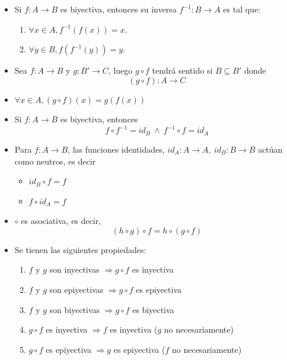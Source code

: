 \documentclass[letterpaper,11pt]{article}
\theoremstyle{plain}
\begin{document}
\begin{framed}
\begin{multicols}{2}
\begin{itemize}
                \item Si $f: A \to B$ es biyectiva, entonces su inversa $f^{-1}:B \to A$ es tal que:
                    \begin{enumerate}
                        \item $\forall x \in A, f^{-1}(f(x))=x$.
                        \item $\forall y \in B, f(f^{-1}(y))=y$. 
                    \end{enumerate}
                    
                \item Sea $f:A \to B$ y $g:B'\to C$, luego $g \circ f$ tendrá sentido si $B\subseteq B'$ donde $$(g \circ f): A \to C $$
    
                \item $ \forall x \in A, (g \circ f)(x)=g(f(x))$
    
                \item Si $f: A \to B$ es biyectiva, entonces $$f \circ f^{-1}=id_{B} ~\land~ f^{-1} \circ f=id_{A}$$
    
                \item Para $f:A \to B$, las funciones identidades,
                $id_{A} : A\to A,~ id_{B} : B \to B$ actúan como neutros, es decir
                    \begin{itemize}
                        \item $id_{B} \circ f=f$
                        \item $f \circ id_{A}=f$
                     \end{itemize}
    
                \item $\circ$ es asociativa, es decir, $$(h \circ g) \circ f=h \circ (g \circ f)$$ 
    
                \item Se tienen las siguientes propiedades:
                    \begin{enumerate}
                    \item $f$ y $g$ son inyectivas $\Rightarrow g\circ f$ es inyectiva
                    \item $f$ y $g$ son epiyectivas $\Rightarrow g\circ f$ es epiyectiva
                    \item $f$ y $g$ son biyectivas $\Rightarrow g\circ f$ es biyectiva
                    \item $g \circ f$ es inyectiva $\Rightarrow f$ es inyectiva ($g$ no necesariamente)
                    \item $g \circ f$ es epiyectiva $\Rightarrow g$ es epiyectiva ($f$ no necesariamente)
                    \end{enumerate}
        

\end{itemize}
\end{multicols}
\end{framed}
\end{document}
